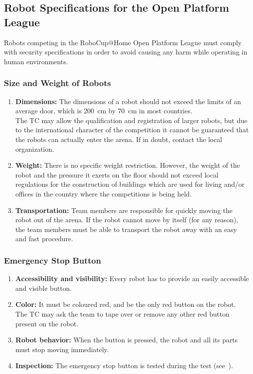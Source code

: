 \subsection{Robot Specifications for the Open Platform League }
Robots competing in the RoboCup@Home Open Platform League must comply with security specifications in order to avoid causing any harm while operating in human environments.

\subsubsection{Size and Weight of Robots}
\label{rule:robots_size}

\begin{enumerate}
	\item \textbf{Dimensions:} The dimensions of a robot should not exceed the limits of an average door, which is \SI{200}{\centi\meter} by \SI{70}{\centi\meter} in most countries.\\
	The TC may allow the qualification and registration of larger robots, but due to the international character of the competition it cannot be guaranteed that the robots can actually enter the arena. If in doubt, contact the local organization.
	\item \textbf{Weight:} There is no specific weight restriction. However, the weight of the robot and the pressure it exerts on the floor should not exceed local regulations for the construction of buildings which are used for living and/or offices in the country where the competitions is being held.
	\item \textbf{Transportation:} Team members are responsible for quickly moving the robot out of the arena.	If the robot cannot move by itself (for any reason), the team members must be able to transport the robot away with an easy and fast procedure.
\end{enumerate}



\subsubsection{Emergency Stop Button}
\label{rule:robots_emergency_button}

\begin{enumerate}
	\item \textbf{Accessibility and visibility:} Every robot has to provide an easily accessible and visible  button.
	\item \textbf{Color:} It must be coloured red, and be the only red button on the robot.
	The TC may ask the team to tape over or remove any other red button present on the robot.
	\item \textbf{Robot behavior:} When the  button is pressed, the robot and all its parts must stop moving immediately.
	\item \textbf{Inspection:} The emergency stop button is tested during the  test (see~).
\end{enumerate}




